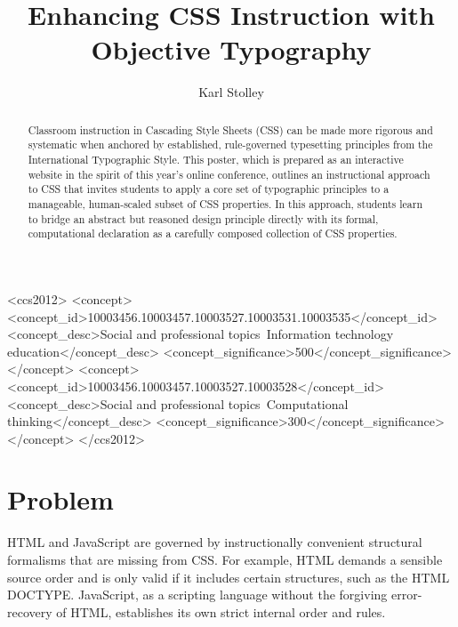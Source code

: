 \documentclass[sigconf,anonymous]{acmart}
\begin{document}
\title{Enhancing CSS Instruction with Objective Typography}

\author{Karl Stolley}
	
\begin{abstract}
	Classroom instruction in Cascading Style Sheets (CSS) can be made more rigorous and systematic when anchored by established, rule-governed typesetting principles from the International Typographic Style. This poster, which is prepared as an interactive website in the spirit of this year’s online conference, outlines an instructional approach to CSS that invites students to apply a core set of typographic principles to a manageable, human-scaled subset of CSS properties. In this approach, students learn to bridge an abstract but reasoned design principle directly with its formal, computational declaration as a carefully composed collection of CSS properties.
\end{abstract}

\begin{CCSXML}
<ccs2012>
<concept>
<concept_id>10003456.10003457.10003527.10003531.10003535</concept_id>
<concept_desc>Social and professional topics~Information technology education</concept_desc>
<concept_significance>500</concept_significance>
</concept>
<concept>
<concept_id>10003456.10003457.10003527.10003528</concept_id>
<concept_desc>Social and professional topics~Computational thinking</concept_desc>
<concept_significance>300</concept_significance>
</concept>
</ccs2012>
\end{CCSXML}




\maketitle

\section{Problem}
HTML and JavaScript are governed by instructionally convenient structural formalisms that are missing from CSS. For example, HTML demands a sensible source order and is only valid if it includes certain structures, such as the HTML DOCTYPE. JavaScript, as a scripting language without the forgiving error-recovery of HTML, establishes its own strict internal order and rules.
\end{document}

